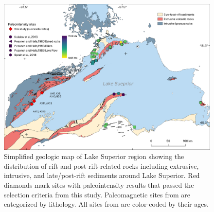\documentclass[9pt,twocolumn,twoside,lineno]{pnas-new}
\begin{document}




\begin{figure}
\centering
\noindent\includegraphics[width=11.4 cm]{Geologic_map.pdf}
\caption{\footnotesize{Simplified geologic map of Lake Superior region showing the distribution of rift and post-rift-related rocks including extrusive, intrusive, and late/post-rift sediments around Lake Superior. Red diamonds mark sites with paleointensity results that passed the selection criteria from this study. Paleomagnetic sites from \cite{Pesonen1983a} are categorized by lithology. All sites from \cite{Pesonen1983a, Kulakov2013a, Sprain2018a} are color-coded by their ages.}}
\label{fig:Geologic_map}
\end{figure}
\end{document}
